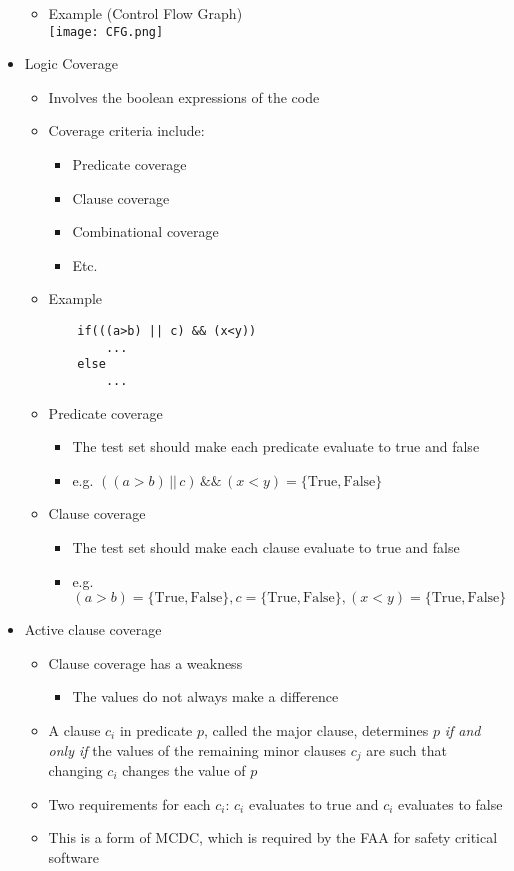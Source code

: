 \documentclass[11pt]{article}
\begin{document}
\begin{itemize}
\begin{itemize}
			\item Example (Control Flow Graph)\\
				\texttt{[image: CFG.png]}
		\end{itemize}

	\item Logic Coverage
		\begin{itemize}
			\item Involves the boolean expressions of the code
			\item Coverage criteria include:
				\begin{itemize}
					\item Predicate coverage
					\item Clause coverage
					\item Combinational coverage
					\item Etc.
				\end{itemize}
			\item Example
\begin{Verbatim}
	if(((a>b) || c) && (x<y))
		...
	else
		...
\end{Verbatim}
			\item Predicate coverage
				\begin{itemize}
					\item The test set should make each predicate evaluate to true and false
					\item e.g. $ ((a>b) \, || \, c) \, \&\& \, (x<y) = \{\text{True}, \text{False}\} $
				\end{itemize}
			\item Clause coverage
				\begin{itemize}
					\item The test set should make each clause evaluate to true and false
					\item e.g. $ (a>b) = \{\text{True}, \text{False}\}, c = \{\text{True}, \text{False}\}, (x<y) = \{\text{True}, \text{False}\} $
				\end{itemize}
		\end{itemize}

	\item Active clause coverage
		\begin{itemize}
			\item Clause coverage has a weakness
				\begin{itemize}
					\item The values do not always make a difference
				\end{itemize}
			\item A clause $ c_i$ in predicate $ p $, called the major clause, determines $ p $ \textit{if and only if} the values of the remaining minor clauses $ c_j $ are such that changing $ c_i $ changes the value of $ p $
			\item Two requirements for each $ c_i $: $ c_i $ evaluates to true and $ c_i $ evaluates to false
			\item This is a form of MCDC, which is required by the FAA for safety critical
			software


\end{itemize}
\end{itemize}
\end{document}
